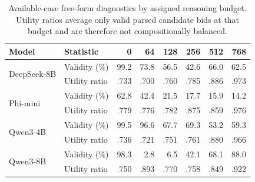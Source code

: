 \begin{table}[H]
\centering
\caption{Available-case free-form diagnostics by assigned reasoning budget. Utility ratios average only valid parsed candidate bids at that budget and are therefore not compositionally balanced.}
\label{tab:freeformbybudget}
\scriptsize
\setlength{\tabcolsep}{3.8pt}
\begin{tabular}{llrrrrrr}
\toprule
Model & Statistic & 0 & 64 & 128 & 256 & 512 & 768 \\
\midrule
\multirow{2}{*}{DeepSeek-8B} & Validity (\%) & 99.2 & 73.8 & 56.5 & 42.6 & 66.0 & 62.5 \\
 & Utility ratio & .733 & .700 & .760 & .785 & .886 & .973 \\
\multirow{2}{*}{Phi-mini} & Validity (\%) & 62.8 & 42.4 & 21.5 & 17.7 & 15.9 & 14.2 \\
 & Utility ratio & .779 & .776 & .782 & .875 & .859 & .976 \\
\multirow{2}{*}{Qwen3-4B} & Validity (\%) & 99.5 & 96.6 & 67.7 & 69.3 & 53.2 & 59.3 \\
 & Utility ratio & .736 & .721 & .751 & .761 & .880 & .966 \\
\multirow{2}{*}{Qwen3-8B} & Validity (\%) & 98.3 & 2.8 & 6.5 & 42.1 & 68.1 & 88.0 \\
 & Utility ratio & .750 & .893 & .770 & .758 & .849 & .922 \\
\bottomrule
\end{tabular}
\end{table}
